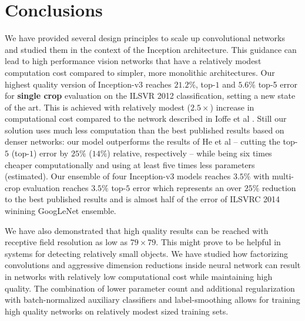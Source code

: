 \section{Conclusions}

We have provided several design principles to scale up convolutional networks
and studied them in the context of the Inception architecture. This
guidance can lead to high performance vision networks that have a relatively
modest computation cost compared to simpler, more monolithic architectures.
Our highest quality version of Inception-v3 reaches $21.2\%$,
top-$1$ and $5.6\%$ top-5 error for {\bf single crop} evaluation
on the ILSVR 2012 classification, setting a new state of the art.
This is achieved with relatively modest ($2.5\times$) increase in computational
cost compared to the network described in Ioffe et al \cite{ioffe2015batch}.
Still our solution uses much less computation than the best published
results based on denser networks: our model outperforms
the results of He et al \cite{he2015delving} -- cutting the top-$5$ (top-$1$)
error by $25\%$ ($14\%$) relative, respectively -- while
being six times cheaper computationally and using at least five times less
parameters (estimated). Our ensemble of four Inception-v3 models reaches
$3.5\%$ with multi-crop evaluation reaches $3.5\%$ top-$5$ error which 
represents an over $25\%$ reduction to the best published results and
is almost half of the error of ILSVRC 2014 winining GoogLeNet ensemble.

We have also demonstrated that high quality results can be reached with
receptive field resolution as low as $79\times 79$. This might prove
to be helpful in systems for detecting relatively small objects.
We have studied how factorizing convolutions and aggressive dimension
reductions inside neural network can result in networks with relatively
low computational cost while maintaining high quality.
The combination of lower parameter count and additional
regularization with batch-normalized auxiliary classifiers and
label-smoothing allows for training high quality networks on relatively
modest sized training sets.
